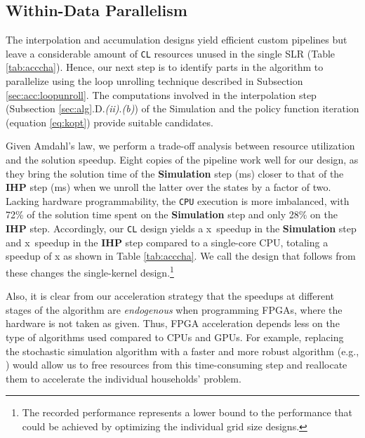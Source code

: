 \documentclass[12pt,american]{article}
\newcommand{\resultsfolder}{./results}
\newcommand{\devfpgaI}{fpgaI}
\newcommand{\devcpu}{cpu-cores}
\newcommand{\nKMIkI}{nKM4-nk100}
\newcommand{\knlI}{knl-1}
\newcommand{\cpucoreI}{1}
\newcommand{\fpgaIdatparknlISimulationSteptime}{\hspace{-0.12cm}ms}
\newcommand{\fpgaIdatparknlIIAPSteptime}{\hspace{-0.12cm}ms}
\newcommand{\fpgaIdatparknlISimulationStepspeedup}{\hspace{-0.12cm}x}
\newcommand{\fpgaIdatparknlIIAPStepspeedup}{\hspace{-0.12cm}x}
\newcommand{\fpgaspeedIknlICPUInKMIkI}{}
\begin{document}
\subsection{Within-Data Parallelism}\label{sec:par:wit}

The interpolation and accumulation designs yield efficient custom pipelines but leave a considerable amount of \texttt{CL} resources unused in the single SLR (Table \ref{tab:acccha}). Hence, our next step is to identify parts in the algorithm to parallelize using the loop unrolling technique described in Subsection \ref{sec:acc:loopunroll}. The computations involved in the interpolation step (Subsection \ref{sec:alg}.D.\textit{(ii)}.\textit{(b)}) of the Simulation and the policy function iteration (equation \eqref{eq:kopt}) provide suitable candidates. 

Given Amdahl's law, we perform a trade-off analysis between resource utilization and the solution speedup. Eight copies of the pipeline work well for our design, as they bring the solution time of the \textbf{Simulation} step (\fpgaIdatparknlISimulationSteptime) closer to that of the \textbf{IHP} step (\fpgaIdatparknlIIAPSteptime) when we unroll the latter over the states by a factor of two. Lacking hardware programmability, the \texttt{CPU} execution is more imbalanced, with 72\% of the solution time spent on the \textbf{Simulation} step and only 28\% on the \textbf{IHP} step. Accordingly, our \texttt{CL} design yields a \fpgaIdatparknlISimulationStepspeedup\ speedup in the \textbf{Simulation} step and \fpgaIdatparknlIIAPStepspeedup\ speedup in the \textbf{IHP} step compared to a single-core CPU, totaling a speedup of \fpgaspeedIknlICPUInKMIkI\hspace{-0.1cm}x as shown in Table \ref{tab:acccha}. We call the design that follows from these changes the single-kernel design.\footnote{The recorded performance represents a lower bound to the performance that could be achieved by optimizing the individual grid size designs.} 

Also, it is clear from our acceleration strategy that the speedups at different stages of the algorithm are \textit{endogenous} when programming FPGAs, where the hardware is not taken as given. Thus, FPGA acceleration depends less on the type of algorithms used compared to CPUs and GPUs. For example, replacing the stochastic simulation algorithm with a faster and more robust algorithm (e.g., \citealp{Young2010}) would allow us to free resources from this time-consuming step and reallocate them to accelerate the individual households' problem.
\end{document}

